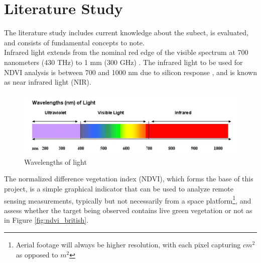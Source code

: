 \chapter{Literature Study}

The literature study includes current knowledge about the subect, is evaluated, and consists of fundamental concepts to note.\\

Infrared light extends from the nominal red edge of the visible spectrum at 700 nanometers (430 THz) to 1 mm (300 GHz) \cite{ir_wiki}. The infrared light to be used for NDVI analysis is between 700 and 1000 nm due to silicon response \cite{ir_wiki}, and is known as near infrared light (NIR).

\begin{figure}[H]
\centering
\includegraphics[scale=0.35]{images/ir_spectrum.png}
\caption{Wavelengths of light \cite{ir_spectrum}}
\label{fig:ir_spectrum}
\end{figure}

The normalized difference vegetation index (NDVI), which forms the base of this project, is a simple graphical indicator that can be used to analyze remote sensing measurements, typically but not necessarily from a space platform\footnote{Aerial footage will always be higher resolution, with each pixel capturing $cm^2$ as opposed to $m^2$}, and assess whether the target being observed contains live green vegetation or not\cite{ndvi_wiki} as in Figure \ref{fig:ndvi_british}.

